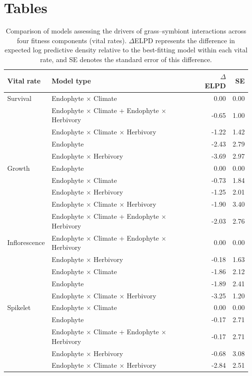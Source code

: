 \documentclass[12pt]{article}\usepackage[]{graphicx}\usepackage[dvipsnames]{xcolor}
\begin{document}
\section*{Tables}
{
\captionsetup[table]{list=no}

\begin{table}[h]
\centering
\caption{Comparison of models assessing the drivers of grass--symbiont interactions across four fitness components (vital rates). 
$\Delta$ELPD represents the difference in expected log predictive density relative to the best-fitting model within each vital rate, and SE denotes the standard error of this difference.}
\label{tab:comp_table_driver}
\begin{tabular}{llrr}
\toprule
\textbf{Vital rate} & \textbf{Model type} & \textbf{$\Delta$ELPD} & \textbf{SE} \\
\midrule

Survival 
& Endophyte $\times$ Climate & 0.00 & 0.00 \\
& Endophyte $\times$ Climate + Endophyte $\times$ Herbivory & -0.65 & 1.00 \\
& Endophyte $\times$ Climate $\times$ Herbivory & -1.22 & 1.42 \\
& Endophyte & -2.43 & 2.79 \\
& Endophyte $\times$ Herbivory & -3.69 & 2.97 \\

Growth 
& Endophyte & 0.00 & 0.00 \\
& Endophyte $\times$ Climate & -0.73 & 1.84 \\
& Endophyte $\times$ Herbivory & -1.25 & 2.01 \\
& Endophyte $\times$ Climate $\times$ Herbivory & -1.90 & 3.40 \\
& Endophyte $\times$ Climate + Endophyte $\times$ Herbivory & -2.03 & 2.76 \\

Inflorescence 
& Endophyte $\times$ Climate + Endophyte $\times$ Herbivory & 0.00 & 0.00 \\
& Endophyte $\times$ Herbivory & -0.18 & 1.63 \\
& Endophyte $\times$ Climate & -1.86 & 2.12 \\
& Endophyte & -1.89 & 2.41 \\
& Endophyte $\times$ Climate $\times$ Herbivory & -3.25 & 1.20 \\

Spikelet 
& Endophyte $\times$ Climate & 0.00 & 0.00 \\
& Endophyte & -0.17 & 2.71 \\
& Endophyte $\times$ Climate + Endophyte $\times$ Herbivory & -0.17 & 2.71 \\
& Endophyte $\times$ Herbivory & -0.68 & 3.08 \\
& Endophyte $\times$ Climate $\times$ Herbivory & -2.84 & 2.51 \\


\end{tabular}
\end{table}}
\end{document}
